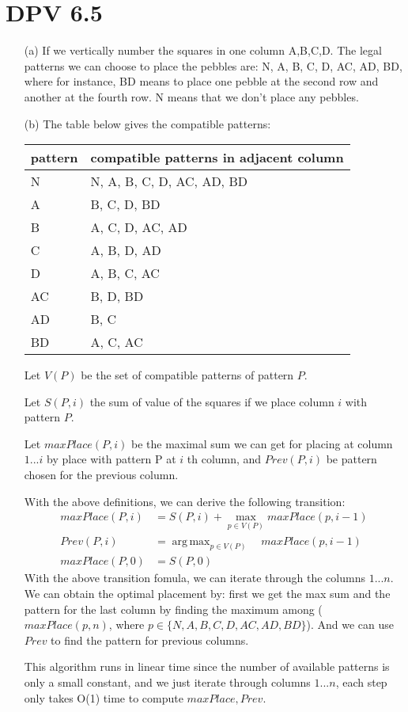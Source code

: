 \documentclass[twoside]{homework}
\DeclareMathOperator*{\argmax}{arg\,max}
\begin{document}
\section{DPV 6.5}
\begin{enumerate}
	\item [(a)] If we vertically number the squares in one column A,B,C,D. The legal patterns we can choose to place the pebbles are: N, A, B, C, D, AC, AD, BD, where for instance, BD means to place one pebble at the second row and another at the fourth row. N means that we don't place any pebbles.
	\item [(b)] The table below gives the compatible patterns:

	\begin{table}[h!]
		\centering
		\begin{tabular}{|l|l|}
		\hline
		pattern & compatible patterns in adjacent column \\ \hline
				N  & N, A, B, C, D, AC, AD, BD \\ \hline
				A  & B, C, D, BD  \\ \hline
				B  & A, C, D, AC, AD\\ \hline
				C  & A, B, D, AD\\ \hline
				D  & A, B, C, AC\\ \hline
				AC & B, D, BD \\ \hline
				AD & B, C\\ \hline
				BD & A, C, AC\\ \hline
		\end{tabular}
		\end{table}
	Let $V(P)$ be the set of compatible patterns of pattern $P$.

	Let $S(P, i)$ the sum of value of the squares if we place column $i$ with pattern $P$.

	Let $maxPlace(P, i)$ be the maximal sum we can get for placing at column $1...i$ by place with pattern P at $i$ th column, and $Prev(P, i)$ be pattern chosen for the previous column.

	With the above definitions, we can derive the following transition:
	\begin{align*}
		maxPlace(P, i) &= S(P, i) + \max_{p \in V(P)} maxPlace(p, i-1)\\
		Prev(P, i) &= \argmax_{p \in V(P)} \quad maxPlace(p, i-1) \\
		maxPlace(P, 0) &= S(P, 0)
	\end{align*}
	With the above transition fomula, we can iterate through the columns $1...n$. We can obtain the optimal placement by: first we get the max sum and the pattern for the last column by finding the maximum among ($maxPlace(p, n)$, where $p\in \{N, A,B,C,D,AC,AD,BD\}$). And we can use $Prev$ to find the pattern for previous columns.

	This algorithm runs in linear time since the number of available patterns is only a small constant, and we just iterate through columns $1...n$, each step only takes O(1) time to compute $maxPlace, Prev$.
\end{enumerate}
\end{document}

